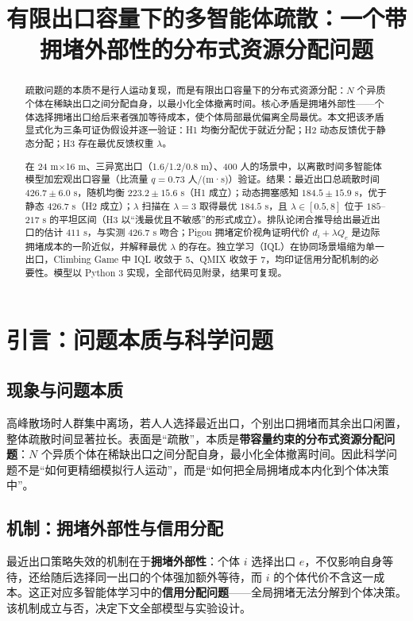 ﻿\documentclass[withoutpreface,bwprint]{cumcmthesis}
\title{有限出口容量下的多智能体疏散：一个带拥堵外部性的分布式资源分配问题}
\begin{document}
\maketitle

\begin{abstract}
疏散问题的本质不是行人运动复现，而是有限出口容量下的分布式资源分配：$N$ 个异质个体在稀缺出口之间分配自身，以最小化全体撤离时间。核心矛盾是拥堵外部性——个体选择拥堵出口给后来者强加等待成本，使个体局部最优偏离全局最优。本文把该矛盾显式化为三条可证伪假设并逐一验证：H1 均衡分配优于就近分配；H2 动态反馈优于静态分配；H3 存在最优反馈权重 $\lambda$。

在 24 m×16 m、三异宽出口（1.6/1.2/0.8 m）、400 人的场景中，以离散时间多智能体模型加宏观出口容量（比流量 $q=0.73$ 人/(m·s)）验证。结果：最近出口总疏散时间 $426.7\pm6.0$ s，随机均衡 $223.2\pm15.6$ s（H1 成立）；动态拥塞感知 $184.5\pm15.9$ s，优于静态 $426.7$ s（H2 成立）；$\lambda$ 扫描在 $\lambda=3$ 取得最优 $184.5$ s，且 $\lambda\in[0.5,8]$ 位于 $185$--$217$ s 的平坦区间（H3 以“浅最优且不敏感”的形式成立）。排队论闭合推导给出最近出口的估计 $411$ s，与实测 $426.7$ s 吻合；Pigou 拥堵定价视角证明代价 $d_i+\lambda Q_e$ 是边际拥堵成本的一阶近似，并解释最优 $\lambda$ 的存在。独立学习（IQL）在协同场景塌缩为单一出口，Climbing Game 中 IQL 收敛于 5、QMIX 收敛于 7，均印证信用分配机制的必要性。模型以 Python 3 实现，全部代码见附录，结果可复现。

\end{abstract}

\section{引言：问题本质与科学问题}

\subsection{现象与问题本质}
高峰散场时人群集中离场，若人人选择最近出口，个别出口拥堵而其余出口闲置，整体疏散时间显著拉长。表面是“疏散”，本质是\textbf{带容量约束的分布式资源分配问题}：$N$ 个异质个体在稀缺出口之间分配自身，最小化全体撤离时间。因此科学问题不是“如何更精细模拟行人运动”，而是“如何把全局拥堵成本内化到个体决策中”。

\subsection{机制：拥堵外部性与信用分配}
最近出口策略失效的机制在于\textbf{拥堵外部性}：个体 $i$ 选择出口 $e$，不仅影响自身等待，还给随后选择同一出口的个体强加额外等待，而 $i$ 的个体代价不含这一成本。这正对应多智能体学习中的\textbf{信用分配问题}——全局拥堵无法分解到个体决策。该机制成立与否，决定下文全部模型与实验设计。
\end{document}
